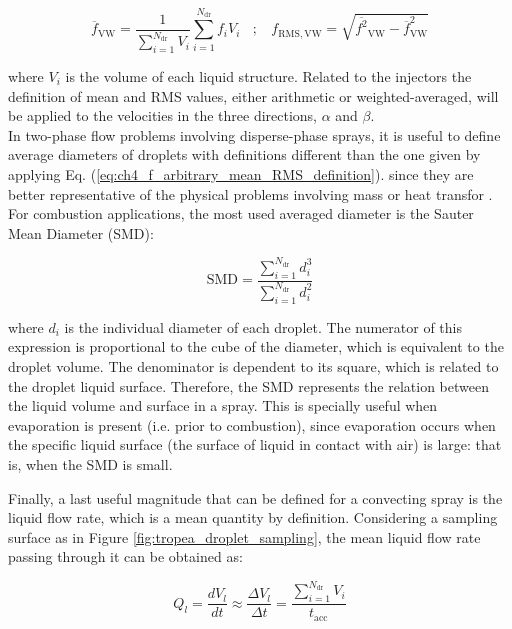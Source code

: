 \begin{equation}
\label{eq:ch4_f_arbitrary_mean_RMS_VW_definition}
\displaystyle \overline{f}_\mathrm{VW} = \frac{1}{\sum_{i=1}^{N_\mathrm{dr}} V_i} \sum_{i=1}^{N_\mathrm{dr}} f_i V_i ~~~~ ; ~~~~ f_\mathrm{RMS,VW} = \sqrt{\displaystyle \overline{f^2 }_\mathrm{VW} - \displaystyle \overline{f }_\mathrm{VW}^2}
\end{equation}

where $V_i$ is the volume of each liquid structure. Related to the injectors the definition of mean and RMS values, either arithmetic or weighted-averaged, will be applied to the velocities in the three directions, $\alpha$ and $\beta$. \\

In two-phase flow problems involving disperse-phase sprays, it is useful to define average diameters of droplets with definitions different than the one given by applying Eq. (\ref{eq:ch4_f_arbitrary_mean_RMS_definition}). since they are better representative of the physical problems involving mass or heat transfor . For combustion applications, the most used averaged diameter is the Sauter Mean Diameter (SMD):

\begin{equation}
\label{eq:ch4_SMD_definition}
\mathrm{SMD} = \frac{\sum_{i=1}^{N_\mathrm{dr}} d_i^3 }{\sum_{i=1}^{N_\mathrm{dr}} d_i^2}
\end{equation} 

where $d_i$ is the individual diameter of each droplet. The numerator of this expression is proportional to the cube of the diameter, which is equivalent to the droplet volume. The denominator is dependent to its square, which is related to the droplet liquid surface. Therefore, the SMD represents the relation between the liquid volume and surface in a spray. This is specially useful when evaporation is present (i.e. prior to combustion), since evaporation occurs when the specific liquid surface (the surface of liquid in contact with air) is large: that is, when the SMD is small.

Finally, a last useful magnitude that can be defined for a convecting spray is the liquid flow rate, which is a mean quantity by definition. Considering a sampling surface as in Figure \ref{fig:tropea_droplet_sampling}, the mean liquid flow rate passing through it can be obtained as:

\begin{equation}
\label{eq:ch4_Ql_definition}
Q_l = \frac{d V_l}{dt} \approx \frac{\Delta V_l}{\Delta t} = \frac{\sum_{i=1}^{N_\mathrm{dr}} V_i}{t_\mathrm{acc}} 
\end{equation}

